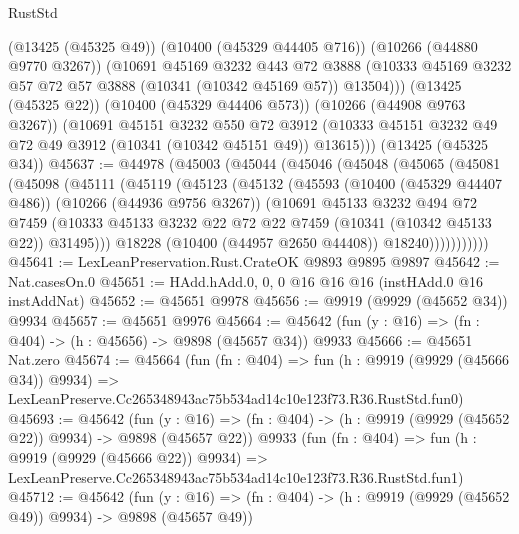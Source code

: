 \begin{lexlean}{RustStd}
\begin{coremodule}
        (@13425 (@45325 @49))
        (@10400 (@45329 @44405 @716))
        (@10266 (@44880 @9770 @3267))
        (@10691
          @45169
          @3232
          @443
          @72
          @3888
          (@10333 @45169 @3232 @57 @72 @57 @3888 (@10341 (@10342 @45169 @57)) @13504)))
      (@13425 (@45325 @22))
      (@10400 (@45329 @44406 @573))
      (@10266 (@44908 @9763 @3267))
      (@10691
        @45151
        @3232
        @550
        @72
        @3912
        (@10333 @45151 @3232 @49 @72 @49 @3912 (@10341 (@10342 @45151 @49)) @13615)))
    (@13425 (@45325 @34))
@45637 := @44978
    (@45003
      (@45044
        (@45046
          (@45048
            (@45065
              (@45081
                (@45098
                  (@45111
                    (@45119
                      (@45123
                        (@45132
                          (@45593
                            (@10400 (@45329 @44407 @486))
                            (@10266 (@44936 @9756 @3267))
                            (@10691
                              @45133
                              @3232
                              @494
                              @72
                              @7459
                              (@10333
                                @45133
                                @3232
                                @22
                                @72
                                @22
                                @7459
                                (@10341 (@10342 @45133 @22))
                                @31495)))
                          @18228
                          (@10400 (@44957 @2650 @44408))
                          @18240)))))))))))
@45641 := LexLeanPreservation.Rust.CrateOK @9893 @9895 @9897
@45642 := Nat.casesOn.{0}
@45651 := HAdd.hAdd.{0, 0, 0} @16 @16 @16 (instHAdd.{0} @16 instAddNat)
@45652 := @45651 @9978
@45656 := @9919 (@9929 (@45652 @34)) @9934
@45657 := @45651 @9976
@45664 := @45642 (fun (y : @16) => (fn : @404) -> (h : @45656) -> @9898 (@45657 @34)) @9933
@45666 := @45651 Nat.zero
@45674 := @45664
    (fun (fn : @404) =>
    fun (h : @9919 (@9929 (@45666 @34)) @9934) =>
    LexLeanPreserve.Cc265348943ac75b534ad14c10e123f73.R36.RustStd.fun0)
@45693 := @45642
    (fun (y : @16) => (fn : @404) -> (h : @9919 (@9929 (@45652 @22)) @9934) -> @9898 (@45657 @22))
    @9933
    (fun (fn : @404) =>
    fun (h : @9919 (@9929 (@45666 @22)) @9934) =>
    LexLeanPreserve.Cc265348943ac75b534ad14c10e123f73.R36.RustStd.fun1)
@45712 := @45642
    (fun (y : @16) => (fn : @404) -> (h : @9919 (@9929 (@45652 @49)) @9934) -> @9898 (@45657 @49))

\end{coremodule}
\end{lexlean}
